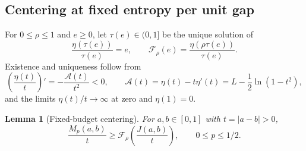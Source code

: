 \documentclass[11pt]{article}
\newtheorem{lemma}[theorem]{Lemma}
\theoremstyle{remark}\newtheorem{remark}[theorem]{Remark}
\numberwithin{equation}{section}
\begin{document}
\subsection{Centering at fixed entropy per unit gap}
For $0\le\rho\le1$ and $e\ge0$, let $\tau(e)\in(0,1]$ be the unique solution of
\[
 \frac{\eta(\tau(e))}{\tau(e)}=e,
 \qquad \mathcal F_\rho(e)=\frac{\eta(\rho\tau(e))}{\tau(e)}.
\]
Existence and uniqueness follow from
\begin{equation}\label{eq:I15-entropy-ratio}
 \left(\frac{\eta(t)}t\right)'=-\frac{\mathscr A(t)}{t^2}<0,
 \qquad \mathscr A(t)=\eta(t)-t\eta'(t)
       =L-\frac12\ln(1-t^2),
\end{equation}
and the limits $\eta(t)/t\to\infty$ at zero and $\eta(1)=0$.

\begin{lemma}[Fixed-budget centering]\label{lem:I15-perspective}
For $a,b\in[0,1]$ with $t=|a-b|>0$,
\begin{equation}\label{eq:I15-pointwise-budget}
 \frac{M_p(a,b)}t\ge
 \mathcal F_\rho\!\left(\frac{J(a,b)}t\right),\qquad 0\le p\le1/2.
\end{equation}
\end{lemma}
\end{document}
